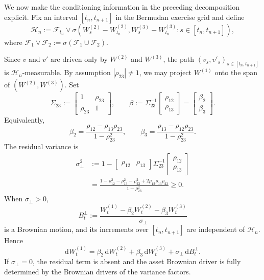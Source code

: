 \documentclass[pdflatex,sn-mathphys-num]{sn-jnl}
\theoremstyle{thmstyleone}%
\theoremstyle{thmstylethree}%
\theoremstyle{thmstyletwo}%
\newcommand{\dd}{\mathrm d}
\newcommand{\F}{\mathcal F}
\begin{document}
We now make the conditioning information in the preceding decomposition explicit.
Fix an interval $[t_n,t_{n+1}]$ in the Bermudan exercise grid and define
$$
\mathcal H_n := \F_{t_n}
\vee \sigma\!\left( W_s^{(2)}-W_{t_n}^{(2)},
W_s^{(3)}-W_{t_n}^{(3)}: s\in[t_n,t_{n+1}]
\right), 
$$
where $\F_1 \vee \F_2 := \sigma(\F_1 \cup \F_2)$.

Since $v$ and $v'$ are driven only by $W^{(2)}$ and $W^{(3)}$, the path
$(v_s,v'_s)_{s\in[t_n,t_{n+1}]}$ is $\mathcal H_n$-measurable. By assumption $|\rho_{23}|\neq1$, we may project
$W^{(1)}$ onto the span of $(W^{(2)},W^{(3)})$. Set
$$
\Sigma_{23}:=
\begin{bmatrix}
1 & \rho_{23}\\
\rho_{23} & 1
\end{bmatrix},
\qquad
\beta:=\Sigma_{23}^{-1}
\begin{bmatrix}
\rho_{12}\\
\rho_{13}
\end{bmatrix}
=
\begin{bmatrix}
\beta_2\\
\beta_3
\end{bmatrix}.
$$
Equivalently,
\begin{equation}\label{eq:proj-coeffs}
\beta_2=\frac{\rho_{12}-\rho_{13}\rho_{23}}{1-\rho_{23}^2},
\qquad
\beta_3=\frac{\rho_{13}-\rho_{12}\rho_{23}}{1-\rho_{23}^2}.
\end{equation}
The residual variance is
\begin{equation}\label{eq:sigperp}
\begin{aligned}
\sigma_\perp^2
&:=
1-
\begin{bmatrix}\rho_{12}&\rho_{13}\end{bmatrix}
\Sigma_{23}^{-1}
\begin{bmatrix}\rho_{12}\\ \rho_{13}\end{bmatrix} \\
&=
\frac{
1-\rho_{12}^2-\rho_{13}^2-\rho_{23}^2
+2\rho_{12}\rho_{13}\rho_{23}
}{1-\rho_{23}^2}
\ge0 .
\end{aligned}
\end{equation}
When $\sigma_\perp>0$,
$$
B_t^\perp
:=
\frac{W_t^{(1)}-\beta_2W_t^{(2)}-\beta_3W_t^{(3)}}{\sigma_\perp}
$$
is a Brownian motion, and its increments over $[t_n,t_{n+1}]$ are independent
of $\mathcal H_n$. Hence
\begin{equation}\label{eq:orth}
\dd W_t^{(1)}
=\beta_2\,\dd W_t^{(2)}
+\beta_3\,\dd W_t^{(3)}
+\sigma_\perp\,\dd B_t^\perp.
\end{equation}
If $\sigma_\perp=0$, the residual term is absent and the asset Brownian driver
is fully determined by the Brownian drivers of the variance factors.
\end{document}

